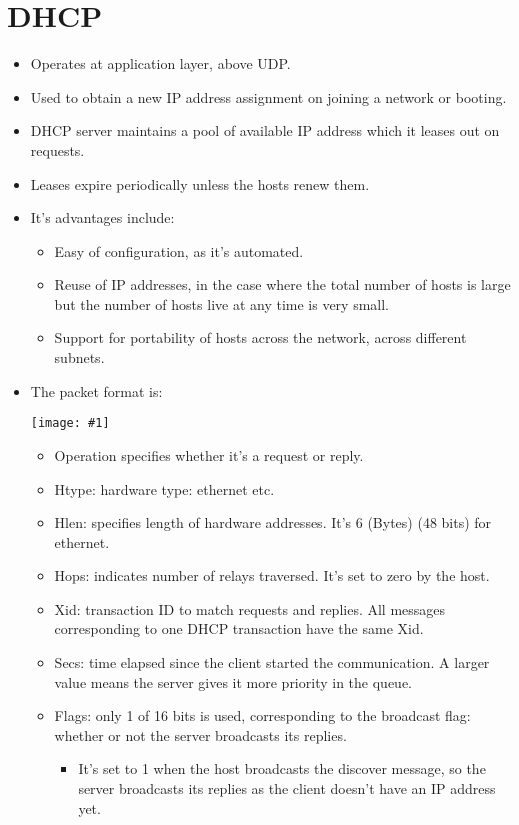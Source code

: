 \documentclass{report}
\makeatletter
\def\maxwidth#1{\ifdim\Gin@nat@width>#1 #1\else\Gin@nat@width\fi}
\newcommand{\mygraphic}[1]{
\begin{center}
    \texttt{[image: \#1]}
\end{center}
}
\makeatother
\begin{document}
\section{DHCP}
\label{sec:dhcp}
\begin{itemize}
\item Operates at application layer, above UDP.
\item Used to obtain a new IP address assignment on joining a network or booting.
\item DHCP server maintains a pool of available IP address which it leases out on requests.
\item Leases expire periodically unless the hosts renew them.
\item It's advantages include:
\begin{itemize}
    \item Easy of configuration, as it's automated.
    \item Reuse of IP addresses, in the case where the total number of hosts is large but the number of hosts live at any time is very small.
    \item Support for portability of hosts across the network, across different subnets.
\end{itemize}
\item The packet format is:
\mygraphic{rsrc/dhcppacket.png}
\begin{itemize}
\item Operation specifies whether it's a request or reply.
\item Htype: hardware type: ethernet etc.
\item Hlen: specifies length of hardware addresses. It's 6 (Bytes) (48 bits) for ethernet.
\item Hops: indicates number of relays traversed. It's set to zero by the host.
\item Xid: transaction ID to match requests and replies. All messages corresponding to one DHCP transaction have the same Xid.
\item Secs: time elapsed since the client started the communication. A larger value means the server gives it more priority in the queue.
\item Flags: only 1 of 16 bits is used, corresponding to the broadcast flag: whether or not the server broadcasts its replies.
\begin{itemize}
\item It's set to 1 when the host broadcasts the discover message, so the server broadcasts its replies as the client doesn't have an IP address yet.

\end{itemize}
\end{itemize}
\end{itemize}
\end{document}
